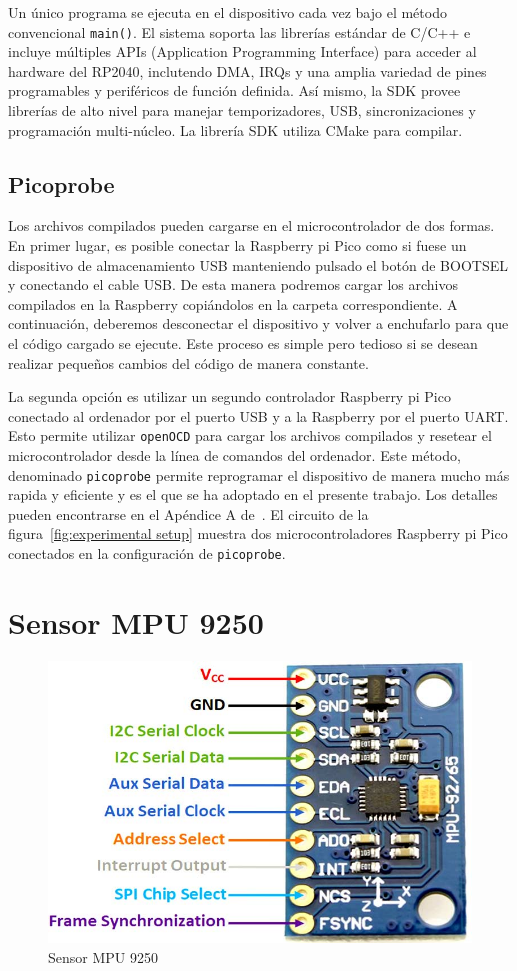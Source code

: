 \documentclass[a4paper,12pt]{book}
\begin{document}
Un único programa se ejecuta en el dispositivo cada vez bajo el método convencional \texttt{main()}. El sistema soporta las librerías estándar de C/C++ e incluye múltiples APIs (Application Programming Interface) para acceder al hardware del RP2040, inclutendo DMA, IRQs y una amplia variedad de pines programables y periféricos de función definida. Así mismo, la SDK provee librerías de alto nivel para manejar temporizadores, USB, sincronizaciones y programación multi-núcleo. La librería SDK utiliza CMake para compilar.

\subsection{Picoprobe}

Los archivos compilados pueden cargarse en el microcontrolador de dos formas. En primer lugar, es posible conectar la Raspberry pi Pico como si fuese un dispositivo de almacenamiento USB manteniendo pulsado el botón de BOOTSEL y conectando el cable USB. De esta manera podremos cargar los archivos compilados en la Raspberry copiándolos en la carpeta correspondiente. A continuación, deberemos desconectar el dispositivo y volver a enchufarlo para que el código cargado se ejecute. Este proceso es simple pero tedioso si se desean realizar pequeños cambios del código de manera constante.

La segunda opción es utilizar un segundo controlador Raspberry pi Pico conectado al ordenador por el puerto USB y a la Raspberry por el puerto UART. Esto permite utilizar \texttt{openOCD} para cargar los archivos compilados y resetear el microcontrolador desde la línea de comandos del ordenador. Este método, denominado \texttt{picoprobe} permite reprogramar el dispositivo de manera mucho más rapida y eficiente y es el que se ha adoptado en el presente trabajo. Los detalles pueden encontrarse en el Apéndice A de~\cite{c/c++-raspberrypiPicot}. El circuito de la figura~\ref{fig:experimental setup} muestra dos microcontroladores Raspberry pi Pico conectados en la configuración de \texttt{picoprobe}.

\section{Sensor MPU 9250}
\begin{figure}[!ht]
    \centering
	\includegraphics[width=0.3\linewidth]{MPU9250-Pin-Diagram.jpg}
 	\caption{Sensor MPU 9250}
 	\label{fig:mpu9250_pinout}
\end{figure}
\end{document}

